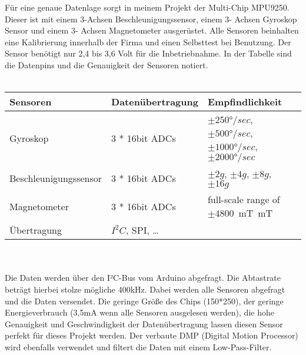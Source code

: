 Für eine genaue Datenlage sorgt in meinem Projekt der Multi-Chip MPU9250. Dieser ist mit 
einem 3-Achsen Beschleunigungssensor, einem 3- Achsen Gyroskop Sensor und einem 3-
Achsen Magnetometer ausgerüstet. Alle Sensoren beinhalten eine Kalibrierung innerhalb der 
Firma und einen Selbsttest bei Benutzung. Der Sensor benötigt nur 2,4 bis 3,6 Volt für die 
Inbetriebnahme. In der Tabelle sind die Datenpins und die Genauigkeit der Sensoren notiert.\\
\\
\begin{tabularx}{0.8\textwidth}{l|X|XX}
Sensoren & Datenübertragung & Empfindlichkeit                                     \\
\hline
Gyroskop & 3 * 16bit ADCs & $\pm250°/sec$, $\pm500°/sec$, $\pm1000°/sec$, $\pm2000°/sec$\\ 
\hline
Beschleunigungssensor & 3 * 16bit ADCs & $\pm2g$, $\pm4g$, $\pm8g$, $\pm16g$\\
\hline
Magnetometer & 3 * 16bit ADCs & full-scale range of $\pm$\SI{4800}{\milli\tesla\meter}T \\
\hline
Übertragung & $I^2C$, SPI, \dots & \\
\end{tabularx}
\\
\\
Die Daten werden über den I²C-Bus vom Arduino abgefragt. Die Abtastrate beträgt hierbei 
stolze mögliche 400kHz. Dabei werden alle Sensoren abgefragt und die Daten versendet.
Die geringe Größe des Chips (150*250), der geringe Energieverbrauch (3,5mA wenn 
alle Sensoren ausgelesen werden), die hohe Genauigkeit und Geschwindigkeit der 
Datenübertragung lassen diesen Sensor perfekt für dieses Projekt werden. Der verbaute
DMP (Digital Motion Processor) wird ebenfalls verwendet und filtert die Daten mit einem
Low-Pass-Filter.

